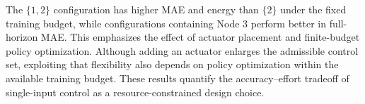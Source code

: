 The $\{1,2\}$ configuration has higher MAE and energy than $\{2\}$ under the fixed training budget, while configurations containing Node 3 perform better in full-horizon MAE. This emphasizes the effect of actuator placement and finite-budget policy optimization. Although adding an actuator enlarges the admissible control set, exploiting that flexibility also depends on policy optimization within the available training budget. These results quantify the accuracy--effort tradeoff of single-input control as a resource-constrained design choice.
